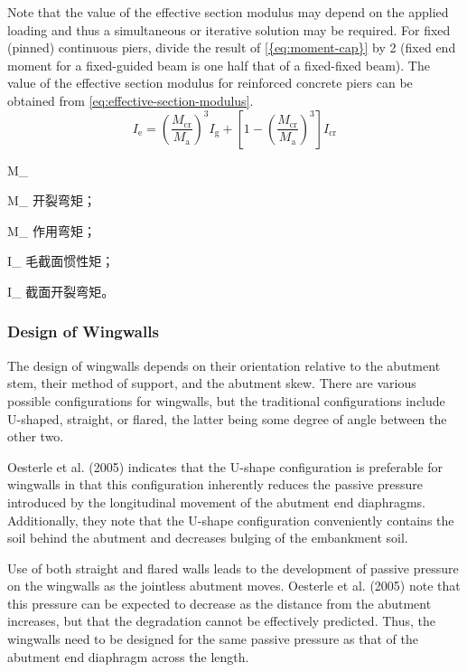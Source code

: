Note that the value of the effective section modulus may depend on the applied loading and thus a simultaneous or iterative solution may be required. For fixed (pinned) continuous piers, divide the result of \cref{{eq:moment-cap}} by 2 (fixed end moment for a fixed-guided beam is one half that of a fixed-fixed beam). The value of the effective section modulus for reinforced concrete piers can be obtained from \cref{eq:effective-section-modulus}.
\begin{equation}
  \label{eq:effective-section-modulus}
  I_\text{e} = \left(\frac{M_\text{cr}}{M_\text{a}}\right)^3 I_\text{g} + \left[ 1-\left(\frac{M_\text{cr}}{M_\text{a}}\right)^3\right] I_\text{cr}
\end{equation}
\begin{EqDesc}{M_}
  \item[M_\text{cr}] 开裂弯矩；
  \item[M_\text{a}] 作用弯矩；
  \item[I_\text{g}] 毛截面惯性矩；
  \item[I_\text{cr}] 截面开裂弯矩。
\end{EqDesc}

\subsubsection{Design of Wingwalls}
The design of wingwalls depends on their orientation relative to the abutment stem, their method of support, and the abutment skew. There are various possible configurations for wingwalls, but the traditional configurations include U-shaped, straight, or flared, the latter being some degree of angle between the other two.

Oesterle et al. (2005) indicates that the U-shape configuration is preferable for wingwalls in that this configuration inherently reduces the passive pressure introduced by the longitudinal movement of the abutment end diaphragms. Additionally, they note that the U-shape configuration conveniently contains the soil behind the abutment and decreases bulging of the embankment soil.

Use of both straight and flared walls leads to the development of passive pressure on the wingwalls as the jointless abutment moves. Oesterle et al. (2005) note that this pressure can be expected to decrease as the distance from the abutment increases, but that the degradation cannot be effectively predicted. Thus, the wingwalls need to be designed for the same passive pressure as that of the abutment end diaphragm across the length.

